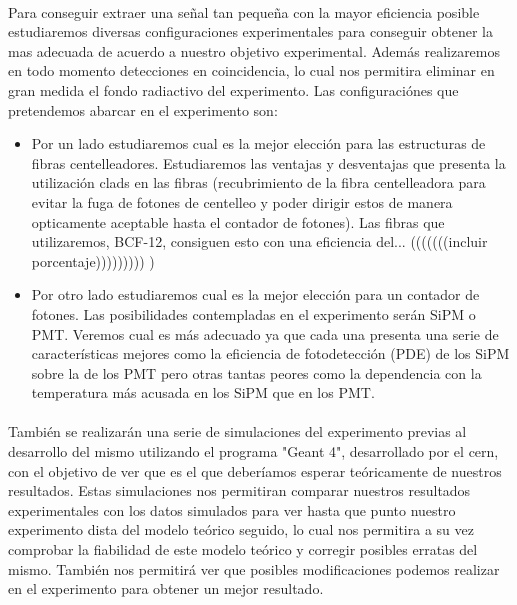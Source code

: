 \paragraph {}
Para conseguir extraer una señal tan pequeña con la mayor eficiencia posible estudiaremos diversas configuraciones experimentales para conseguir obtener la mas adecuada de acuerdo a nuestro objetivo experimental. Además realizaremos en todo momento detecciones en coincidencia, lo cual nos permitira eliminar en gran medida el fondo radiactivo del experimento. Las configuraciónes que pretendemos abarcar en el experimento son: 
\begin{itemize}
\item {}
Por un lado estudiaremos cual es la mejor elección para las estructuras de fibras centelleadores. Estudiaremos las ventajas y desventajas que presenta la utilización clads en las fibras (recubrimiento de la fibra centelleadora para evitar la fuga de fotones de centelleo y poder dirigir estos de manera opticamente aceptable hasta el contador de fotones). Las fibras que utilizaremos, BCF-12, consiguen esto con una eficiencia del... (((((((incluir porcentaje)))))))))  ) 
\item {}
Por otro lado estudiaremos cual es la mejor elección para un contador de fotones. Las posibilidades contempladas en el experimento serán SiPM o PMT. Veremos cual es más adecuado ya que cada una presenta una serie de características mejores como la eficiencia de fotodetección (PDE) de los SiPM sobre la de los PMT pero otras tantas peores como la dependencia con la temperatura más acusada en los SiPM que en los PMT.
\end{itemize}

\paragraph {}
También se realizarán una serie de simulaciones del experimento previas al desarrollo del mismo utilizando el programa "Geant 4", desarrollado por el cern, con el objetivo de ver que es el que deberíamos esperar teóricamente de nuestros resultados. Estas simulaciones nos permitiran comparar nuestros resultados experimentales con los datos simulados para ver hasta que punto nuestro experimento dista del modelo teórico seguido, lo cual nos permitira a su vez comprobar la fiabilidad de este modelo teórico y corregir posibles erratas del mismo. También nos permitirá ver que posibles modificaciones podemos realizar en el experimento para obtener un mejor resultado.

